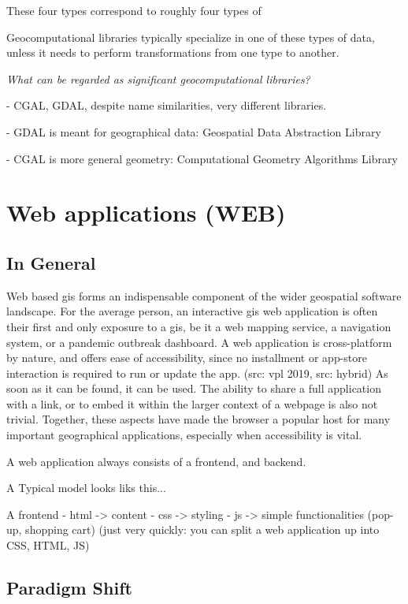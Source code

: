 These four types correspond to roughly four types of 

Geocomputational libraries typically specialize in one of these types of data, unless it needs to perform transformations from one type to another. 

\emph{What can be regarded as significant geocomputational libraries?}

- CGAL, GDAL, despite name similarities, very different libraries. 

- GDAL is meant for geographical data: Geospatial Data Abstraction Library

- CGAL is more general geometry: Computational Geometry Algorithms Library

\section{Web applications (WEB)}
\label{sec:background-web}


\subsection{In General}

Web based \ac{gis} forms an indispensable component of the wider geospatial software landscape. 
For the average person, an interactive \ac{gis} web application is often their first and only exposure to a \acs{gis}, be it a web mapping service, a navigation system, or a pandemic outbreak dashboard. 
A web application is cross-platform by nature, and offers ease of accessibility, since no installment or app-store interaction is required to run or update the app. (src: vpl 2019, src: hybrid)
As soon as it can be found, it can be used.
The ability to share a full application with a link, or to embed it within the larger context of a webpage is also not trivial. 
Together, these aspects have made the browser a popular host for many important geographical applications, especially when accessibility is vital.

A web application always consists of a frontend, and backend.

A Typical model looks liks this...

A frontend 
- html -> content 
- css -> styling 
- js -> simple functionalities (pop-up, shopping cart)
(just very quickly: you can split a web application up into CSS, HTML, JS)

\subsection{Paradigm Shift}

